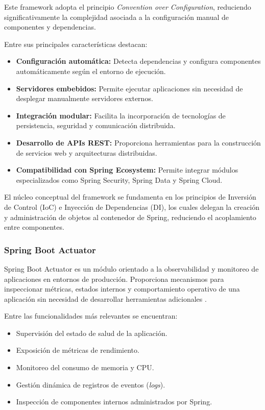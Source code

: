 Este framework adopta el principio \textit{Convention over Configuration}, reduciendo significativamente la complejidad asociada a la configuración manual de componentes y dependencias.

Entre sus principales características destacan:

\begin{itemize}
\item \textbf{Configuración automática:} Detecta dependencias y configura componentes automáticamente según el entorno de ejecución.

\item \textbf{Servidores embebidos:} Permite ejecutar aplicaciones sin necesidad de desplegar manualmente servidores externos.

\item \textbf{Integración modular:} Facilita la incorporación de tecnologías de persistencia, seguridad y comunicación distribuida.

\item \textbf{Desarrollo de APIs REST:} Proporciona herramientas para la construcción de servicios web y arquitecturas distribuidas.

\item \textbf{Compatibilidad con Spring Ecosystem:} Permite integrar módulos especializados como Spring Security, Spring Data y Spring Cloud.
\end{itemize}

El núcleo conceptual del framework se fundamenta en los principios de Inversión de Control (IoC) e Inyección de Dependencias (DI), los cuales delegan la creación y administración de objetos al contenedor de Spring, reduciendo el acoplamiento entre componentes.

\subsubsection{Spring Boot Actuator}

Spring Boot Actuator es un módulo orientado a la observabilidad y monitoreo de aplicaciones en entornos de producción. Proporciona mecanismos para inspeccionar métricas, estados internos y comportamiento operativo de una aplicación sin necesidad de desarrollar herramientas adicionales \cite{51}.

Entre las funcionalidades más relevantes se encuentran:

\begin{itemize}
\item Supervisión del estado de salud de la aplicación.
\item Exposición de métricas de rendimiento.
\item Monitoreo del consumo de memoria y CPU.
\item Gestión dinámica de registros de eventos (\textit{logs}).
\item Inspección de componentes internos administrados por Spring.
\end{itemize}

